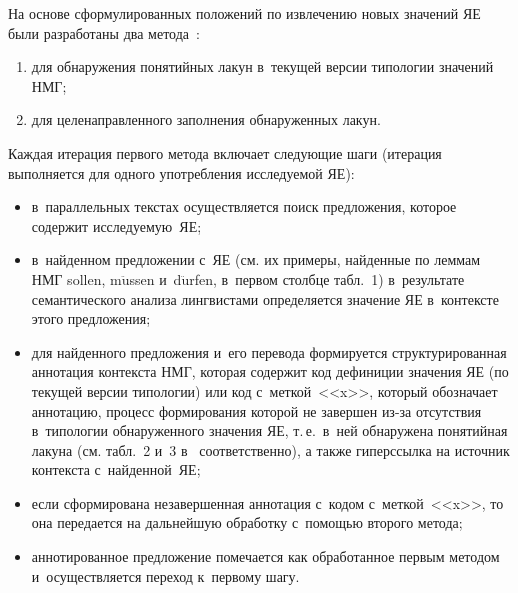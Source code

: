 \begin{multicols}{2}
  На основе сформулированных положений по извлечению новых значений 
ЯЕ были разработаны два метода~\cite{15-z}:
  \begin{enumerate}[(1)]
  \item для обнаружения понятийных лакун в~текущей версии типологии 
значений НМГ;
  \item  для целенаправленного заполнения обнаруженных лакун.
  \end{enumerate}
  
  Каждая итерация первого метода включает следующие шаги (итерация 
выполняется для одного употребления исследуемой ЯЕ):
  \begin{itemize}
\item в~параллельных текстах осуществляется поиск предложения, которое 
содержит ис\-сле\-ду\-емую~ЯЕ;
\item в~найденном предложении с~ЯЕ (см. их примеры, найденные по леммам 
НМГ sollen, m$\ddot{\mbox{u}}$ssen и~d$\ddot{\mbox{u}}$rfen, в~первом 
столбце табл.~1) в~результате семантического анализа лингвистами 
определяется значение ЯЕ в~контексте этого предложения;
\item для найденного предложения и~его перевода формируется 
структурированная аннотация контекста НМГ, которая содержит код 
дефиниции значения ЯЕ (по текущей версии типологии) или код 
с~меткой~<<x>>, который обозначает аннотацию, процесс формирования 
которой не завершен из-за отсутствия в~типологии обнаруженного значения 
ЯЕ, т.\,е.\ в~ней обнаружена понятийная лакуна (см. табл.~2 и~3 в~\cite{14-z} 
соответственно), а также гиперссылка на источник контекста 
с~найденной~ЯЕ;
\item если сформирована незавершенная аннотация с~кодом с~меткой~<<x>>, 
то она передается на дальнейшую обработку с~помощью второго метода;
\item аннотированное предложение помечается как обработанное первым 
методом и~осуществляется переход к~первому шагу.
\end{itemize}


\end{multicols}
